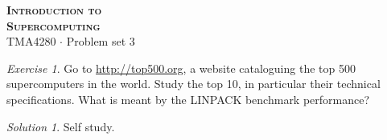 \documentclass[onecolumn, oneside, a4paper, 11pt]{memoir}
\theoremstyle{remark}
\newtheorem{ex}{Exercise}
\newtheorem*{sol}{Solution}
\begin{document}
\pagestyle{empty}

\begin{center}
  {\Huge \bfseries \scshape
    Introduction to \\[0.2\baselineskip] Supercomputing} \\[2\baselineskip]
  {\Large TMA4280 $\cdot$ Problem set 3} \\[2\baselineskip]
\end{center}

\begin{ex}
  Go to \url{http://top500.org}, a website cataloguing the top 500
  supercomputers in the world. Study the top 10, in particular their technical
  specifications. What is meant by the LINPACK benchmark performance?
\end{ex}
\begin{sol}
  Self study.
\end{sol}
\end{document}
